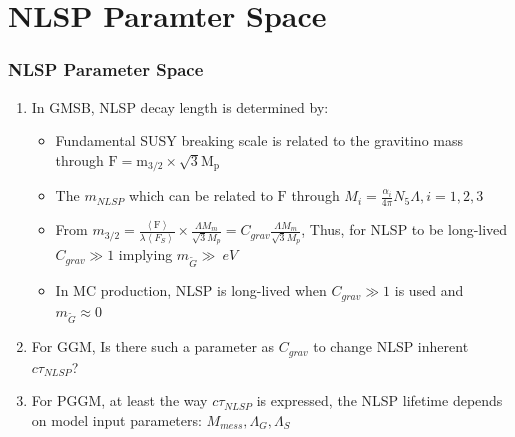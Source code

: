 \documentclass[12pt]{beamer}
\begin{document}
\section{NLSP Paramter Space}
\begin{frame}
\frametitle[c]{NLSP Parameter Space}

\begin{enumerate}
\item In GMSB, NLSP decay length is determined by:
    \begin{itemize}
    \item Fundamental SUSY breaking scale is related to the gravitino mass through $\displaystyle{\mathrm{F = m_{3/2}\times\sqrt{3}M_{p}}}$ 
    \item The $m_{NLSP}$ which can be related to $\mathrm{F}$ through $\displaystyle{M_{i} = \frac{\alpha_{i}}{4\pi}N_{5}\Lambda, i = 1, 2, 3 }$
    \item From $\displaystyle{ m_{3/2} =\frac{\mathrm{ \left\langle F \right\rangle}}{\lambda \left\langle F_{S} \right\rangle} \times \frac{\Lambda M_{m}}{\sqrt{3}M_{p}} = C_{grav}\frac{\Lambda M_{m}} {\sqrt{3}M_{p}} } $, 
    Thus, for NLSP to be long-lived $\displaystyle{C_{grav} \gg 1} $ implying $\displaystyle{m_{\tilde{G}} \gg ~eV }$
    \item In MC production, NLSP is long-lived when $C_{grav} \gg 1$ is used and $m_{\tilde{G}} \approx 0 $
        \end{itemize}
\item For GGM, \alert{Is there such a parameter as $C_{grav}$ to change NLSP inherent $c\tau_{NLSP}$}? 
\item For PGGM, at least the way $c\tau_{NLSP}$ is expressed, the NLSP lifetime depends on model input parameters: $M_{mess}, \Lambda_{G},\Lambda_{S}$
\end{enumerate}
\end{frame}
\end{document}
